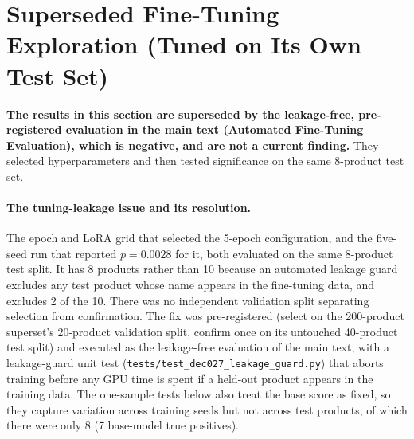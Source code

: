 \documentclass[11pt]{article}
\begin{document}
\section{Superseded Fine-Tuning Exploration (Tuned on Its Own Test Set)}
\label{sec:s5}

\textbf{The results in this section are superseded by the leakage-free,
pre-registered evaluation in the main text (Automated Fine-Tuning Evaluation), which is
negative, and are not a current finding.} They selected hyperparameters
and then tested significance on the same 8-product test set.

\paragraph{The tuning-leakage issue and its resolution.} The epoch and
LoRA grid that selected the 5-epoch configuration, and the five-seed
run that reported $p=0.0028$ for it, both evaluated on the same 8-product
test split. It has 8 products rather than 10 because an automated
leakage guard excludes any test product whose name appears in the
fine-tuning data, and excludes 2 of the 10. There was no independent
validation split separating selection from confirmation. The fix was
pre-registered (select on the 200-product superset's 20-product
validation split, confirm once on its untouched 40-product test split)
and executed as the leakage-free evaluation of the main text, with a
leakage-guard unit test
(\texttt{tests/test\_dec027\_leakage\_guard.py}) that aborts training
before any GPU time is spent if a held-out product appears in the
training data. The one-sample tests below also treat the base score as
fixed, so they capture variation across training seeds but not across
test products, of which there were only 8 (7 base-model true
positives).
\end{document}
